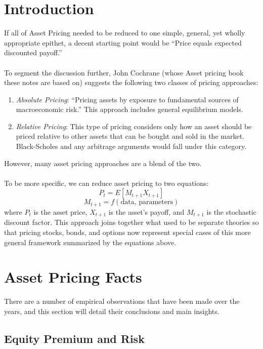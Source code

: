 \documentclass[12pt]{article}
\theoremstyle{plain}
\theoremstyle{definition}
\theoremstyle{remark}
\begin{document}
\newpage
\section{Introduction}

If all of Asset Pricing needed to be reduced to one simple,
general, yet wholly appropriate epithet, a decent starting
point would be ``Price equals expected discounted payoff.''
\\
\\
To segment the discussion further, John Cochrane (whose Asset pricing book
these notes are based on) suggests the following two classes of pricing
approaches:
\begin{enumerate}
    \item {\sl Absolute Pricing}: ``Pricing assets by exposure
	to fundamental sources of macroeconomic risk.'' This
	approach includes general equilibrium models.
    \item {\sl Relative Pricing}: This type of pricing considers
	only how an asset should be priced relative to
	other assets that can be bought and sold in the
	market. Black-Scholes and any arbitrage arguments
	would fall under this category.
\end{enumerate}
However, many asset pricing approaches are a blend of the two.
\\
\\
To be more specific, we can reduce asset pricing to two
equations:
\begin{equation}
    P_t = E[M_{t+1} X_{t+1} ]
\end{equation}
\begin{equation}
    M_{t+1} = f(\text{data, parameters})
\end{equation}
where $P_t$ is the asset price, $X_{t+1}$ is the asset's payoff,
and $M_{t+1}$ is the stochastic discount factor.
This approach joins together what used to be separate theories so
that pricing stocks, bonds, and options now represent special
cases of this more general framework summarized by the equations above.


\section{Asset Pricing Facts}

There are a number of empirical observations that have been made
over the years, and this section will detail their conclusions
and main insights.

\subsection{Equity Premium and Risk}
\end{document}
